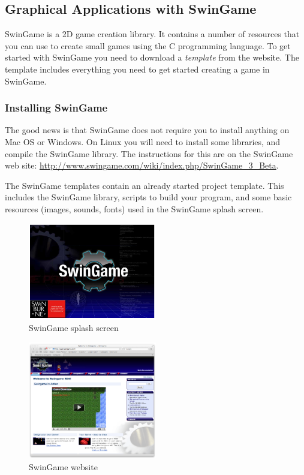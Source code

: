 \clearpage
\subsection{Graphical Applications with SwinGame} %
\label{sub:graphical_applications_with_swingame}

SwinGame is a 2D game creation library. It contains a number of resources that you can use to create small games using the C programming language. To get started with SwinGame you need to download a \emph{template} from the website. The template includes everything you need to get started creating a game in SwinGame.

\subsubsection{Installing SwinGame} %
\label{ssub:installing_swingame}

The good news is that SwinGame does not require you to install anything on Mac OS or Windows. On Linux you will need to install some libraries, and compile the SwinGame library. The instructions for this are on the SwinGame web site: \url{http://www.swingame.com/wiki/index.php/SwinGame_3_Beta}.

The SwinGame templates contain an already started project template. This includes the SwinGame library, scripts to build your program, and some basic resources (images, sounds, fonts) used in the SwinGame splash screen.

\begin{figure}[h]
   \centering
   \includegraphics[width=0.5\textwidth]{./topics/programs-and-compilers/images/SwinGameSplash} 
   \caption{SwinGame splash screen}
   \label{fig:swingame-splash}
\end{figure}

\begin{figure}[h]
   \centering
   \includegraphics[width=0.5\textwidth]{./topics/programs-and-compilers/images/SwinGameSite} 
   \caption{SwinGame website}
   \label{fig:swingame-site}
\end{figure}


